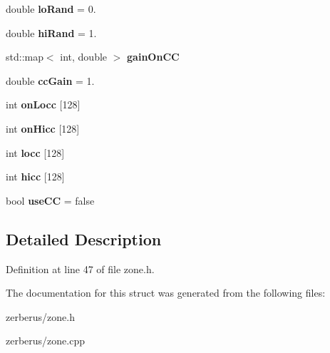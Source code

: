 \begin{DoxyCompactItemize}
\mbox{\label{struct_zone_a895ece6677b942e050c55d20e4b8aa66}} 
double {\bfseries lo\+Rand} = 0.
\item 
\mbox{\label{struct_zone_a2a617451f9f3e1d64517c9e0300bcf6d}} 
double {\bfseries hi\+Rand} = 1.
\item 
\mbox{\label{struct_zone_a2dcd43cc8d2c03a858fe8544ceb32ea3}} 
std\+::map$<$ int, double $>$ {\bfseries gain\+On\+CC}
\item 
\mbox{\label{struct_zone_a411be2983672a97421145480952a4af2}} 
double {\bfseries cc\+Gain} = 1.
\item 
\mbox{\label{struct_zone_af425d95a35f6b6c6552d26fc45fdf8e4}} 
int {\bfseries on\+Locc} \mbox{[}128\mbox{]}
\item 
\mbox{\label{struct_zone_ac06dbd085f91025582b13da7243d1266}} 
int {\bfseries on\+Hicc} \mbox{[}128\mbox{]}
\item 
\mbox{\label{struct_zone_a2cfec3f59a4fe231ded08f6ba52fb002}} 
int {\bfseries locc} \mbox{[}128\mbox{]}
\item 
\mbox{\label{struct_zone_a87fe843aa42e748f06d5e51a6c74c464}} 
int {\bfseries hicc} \mbox{[}128\mbox{]}
\item 
\mbox{\label{struct_zone_a4a918ba5b1c2332039c600eea86157d2}} 
bool {\bfseries use\+CC} = false
\end{DoxyCompactItemize}


\subsection{Detailed Description}


Definition at line 47 of file zone.\+h.



The documentation for this struct was generated from the following files\+:\begin{DoxyCompactItemize}
\item 
zerberus/zone.\+h\item 
zerberus/zone.\+cpp\end{DoxyCompactItemize}
